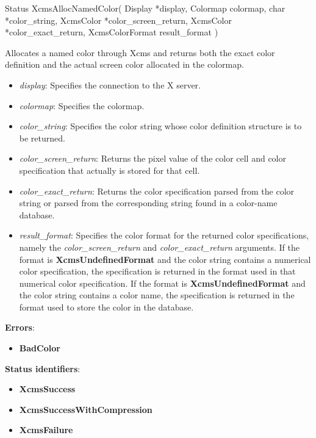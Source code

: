 \documentclass{report}
\begin{document}
\begin{itemize}
            \begin{cppcode}
                Status XcmsAllocNamedColor(
                    Display *display,
                    Colormap colormap,
                    char *color_string,
                    XcmsColor *color_screen_return,
                    XcmsColor *color_exact_return,
                    XcmsColorFormat result_format
                )
            \end{cppcode}
            \bigbreak \noindent
            Allocates a named color through Xcms and returns both the exact color definition and the actual screen color allocated in the colormap.
            \begin{itemize}
                \item \textit{display}: Specifies the connection to the X server.
                \item \textit{colormap}: Specifies the colormap.
                \item \textit{color\_string}: Specifies the color string whose color definition structure is to be returned.
                \item \textit{color\_screen\_return}: Returns the pixel value of the color cell and color specification that actually is stored for that cell.
                \item \textit{color\_exact\_return}: Returns the color specification parsed from the color string or parsed from the corresponding string found in a color-name database.
                \item \textit{result\_format}: Specifies the color format for the returned color specifications, namely the \textit{color\_screen\_return} and \textit{color\_exact\_return} arguments. If the format is \textbf{XcmsUndefinedFormat} and the color string contains a numerical color specification, the specification is returned in the format used in that numerical color specification. If the format is \textbf{XcmsUndefinedFormat} and the color string contains a color name, the specification is returned in the format used to store the color in the database.
            \end{itemize}
            \bigbreak \noindent
            \textbf{Errors}:
            \begin{itemize}
                \item \textbf{BadColor}
            \end{itemize}
            \bigbreak \noindent
            \textbf{Status identifiers}:
            \begin{itemize}
                \item \textbf{XcmsSuccess}
                \item \textbf{XcmsSuccessWithCompression}
                \item \textbf{XcmsFailure}
            \end{itemize}


\end{itemize}
\end{document}
